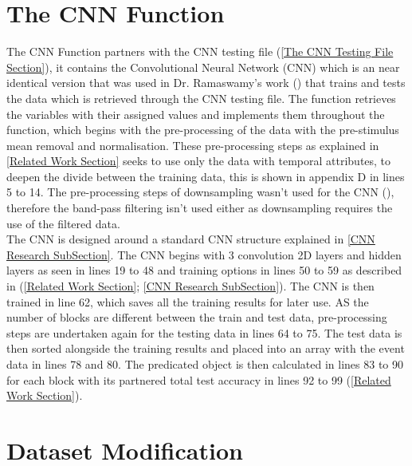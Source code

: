 \section{The CNN Function}
\label{The CNN Function Section}

The CNN Function partners with the CNN testing file (\cref{The CNN Testing File Section}), it contains the Convolutional Neural Network (CNN) which is an near identical version that was used in Dr. Ramaswamy's work (\cite{PalaniPaper}) that trains and tests the data which is retrieved through the CNN testing file. The function retrieves the variables with their assigned values and implements them throughout the function, which begins with the pre-processing of the data with the pre-stimulus mean removal and normalisation. These pre-processing steps as explained in \cref{Related Work Section} seeks to use only the data with temporal attributes, to deepen the divide between the training data, this is shown in appendix D in lines 5 to 14. The pre-processing steps of downsampling wasn't used for the CNN (\cite{PalaniPaper}), therefore the band-pass filtering isn't used either as downsampling requires the use of the filtered data. \\

The CNN is designed around a standard CNN structure explained in \cref{CNN Research SubSection}. The CNN begins with 3 convolution 2D layers and hidden layers as seen in lines 19 to 48 and training options in lines 50 to 59 as described in (\cref{Related Work Section}; \cref{CNN Research SubSection}). The CNN is then trained in line 62, which saves all the training results for later use. AS the number of blocks are different between the train and test data, pre-processing steps are undertaken again for the testing data in lines 64 to 75. The test data is then sorted alongside the training results and placed into an array with the event data in lines 78 and 80. The predicated object is then calculated in lines 83 to 90 for each block with its partnered total test accuracy in lines 92 to 99 (\cref{Related Work Section}). \\

\section{Dataset Modification}
\label{Dataset Modification Section}

